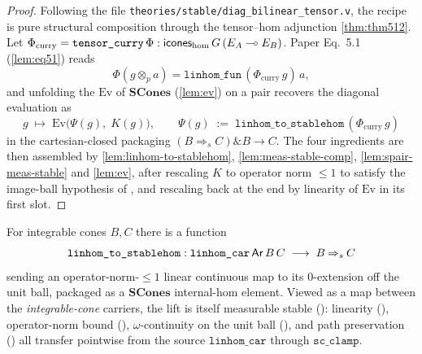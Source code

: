 \begin{proof}
Following the file
\texttt{theories/stable/diag\_bilinear\_tensor.v}, the recipe is pure
structural composition through the tensor--hom adjunction
\autoref{thm:thm512}. Let
$\Phi_{\mathrm{curry}} = \texttt{tensor\_curry}\,\Phi :
\mathsf{icones}_{\mathrm{hom}}\,G\,(E_A \multimap E_B)$. Paper Eq.\ 5.1
(\autoref{lem:eq51}) reads
\[
  \Phi(g \otimes_p a) =
  \texttt{linhom\_fun}\,(\Phi_{\mathrm{curry}}\,g)\,a,
\]
and unfolding the $\mathrm{Ev}$ of $\mathbf{SCones}$
(\autoref{lem:ev}) on a pair recovers the diagonal evaluation as
\[
  g \;\mapsto\; \mathrm{Ev}\bigl(
    \Psi(g),\; K(g)
  \bigr),\qquad
  \Psi(g) \;:=\; \texttt{linhom\_to\_stablehom}\,
                   (\Phi_{\mathrm{curry}}\,g)
\]
in the cartesian-closed packaging
$(B \mathbin{\Rightarrow_s} C) \mathbin{\&} B \to C$. The four
ingredients are then assembled by \autoref{lem:linhom-to-stablehom},
\autoref{lem:meas-stable-comp}, \autoref{lem:spair-meas-stable} and
\autoref{lem:ev}, after rescaling $K$ to operator norm $\leq 1$ to
satisfy the image-ball hypothesis of
, and rescaling back at
the end by linearity of $\mathrm{Ev}$ in its first slot.
\end{proof}

\begin{lemma}%
\label{lem:linhom-to-stablehom}
\rocqok
{}\rocqok
{}
For integrable cones $B, C$ there is a function
\[
  \texttt{linhom\_to\_stablehom} :
  \texttt{linhom\_car}\,\mathsf{Ar}\,B\,C
  \;\longrightarrow\;
  B \mathbin{\Rightarrow_s} C
\]
sending an operator-norm-$\leq 1$ linear continuous map to its
$0$-extension off the unit ball, packaged as a
$\mathbf{SCones}$ internal-hom element. Viewed as a map between the
\emph{integrable-cone} carriers, the lift is itself measurable stable
():
linearity (),
operator-norm bound
(),
$\omega$-continuity on the unit ball
(),
and path preservation
()
all transfer pointwise from the source $\texttt{linhom\_car}$ through
$\texttt{sc\_clamp}$.
\end{lemma}

